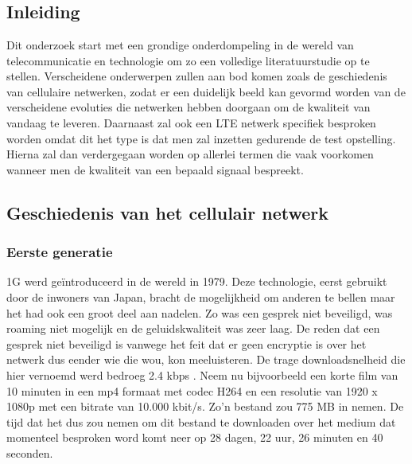 \chapter{}%
\label{ch:stand-van-zaken}



\section{Inleiding}

Dit onderzoek start met een grondige onderdompeling in de wereld van telecommunicatie en technologie om zo een volledige literatuurstudie op te stellen. Verscheidene onderwerpen zullen aan bod komen zoals de geschiedenis van cellulaire netwerken, zodat er een duidelijk beeld kan gevormd worden van de verscheidene evoluties die netwerken hebben doorgaan om de kwaliteit van vandaag te leveren. Daarnaast zal ook een LTE netwerk specifiek besproken worden omdat dit het type is dat men zal inzetten gedurende de test opstelling. Hierna zal dan verdergegaan worden op allerlei termen die vaak voorkomen wanneer men de kwaliteit van een bepaald signaal bespreekt.

\section{Geschiedenis van het cellulair netwerk}

\subsection{Eerste generatie}

1G werd geïntroduceerd in de wereld in 1979. Deze technologie, eerst gebruikt door de inwoners van Japan, bracht de mogelijkheid om anderen te bellen maar het had ook een groot deel aan nadelen. Zo was een gesprek niet beveiligd, was roaming niet mogelijk en de geluidskwaliteit was zeer laag.
De reden dat een gesprek niet beveiligd is vanwege het feit dat er geen encryptie is over het netwerk dus eender wie die wou, kon meeluisteren. De trage downloadsnelheid die hier vernoemd werd bedroeg 2.4 kbps \autocite{Galazzo2020}. Neem nu bijvoorbeeld een korte film van 10 minuten in een mp4 formaat met codec H264 en een resolutie van 1920 x 1080p met een bitrate van 10.000 kbit/s. Zo'n bestand zou 775 MB in nemen. \autocite{Helme2019} De tijd dat het dus zou nemen om dit bestand te downloaden over het medium dat momenteel besproken word komt neer op 28 dagen, 22 uur, 26 minuten en 40 seconden. \autocite{Wooding2024}

